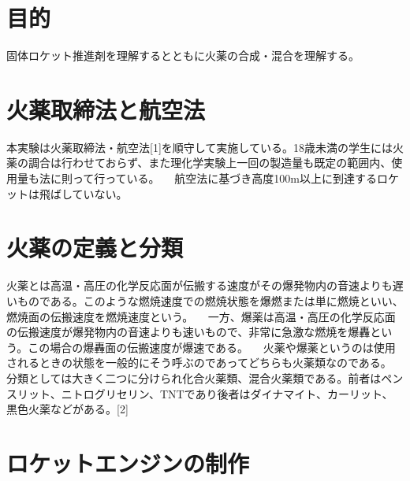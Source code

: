 \section{目的}
固体ロケット推進剤を理解するとともに火薬の合成・混合を理解する。
\section{火薬取締法と航空法}
本実験は火薬取締法・航空法[1]を順守して実施している。18歳未満の学生には火薬の調合は行わせておらず、また理化学実験上一回の製造量も既定の範囲内、使用量も法に則って行っている。
　航空法に基づき高度100m以上に到達するロケットは飛ばしていない。
\section{火薬の定義と分類}
火薬とは高温・高圧の化学反応面が伝搬する速度がその爆発物内の音速よりも遅いものである。このような燃焼速度での燃焼状態を爆燃または単に燃焼といい、燃焼面の伝搬速度を燃焼速度という。
　一方、爆薬は高温・高圧の化学反応面の伝搬速度が爆発物内の音速よりも速いもので、非常に急激な燃焼を爆轟という。この場合の爆轟面の伝搬速度が爆速である。
　火薬や爆薬というのは使用されるときの状態を一般的にそう呼ぶのであってどちらも火薬類なのである。
分類としては大きく二つに分けられ化合火薬類、混合火薬類である。前者はペンスリット、ニトログリセリン、TNTであり後者はダイナマイト、カーリット、黒色火薬などがある。[2]

\section{ロケットエンジンの制作}
